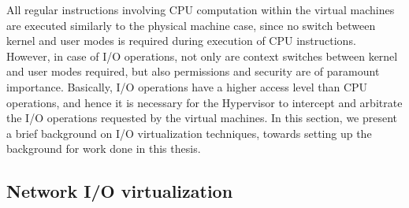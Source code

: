 All regular instructions involving CPU computation within the
virtual machines are executed similarly to the physical machine
case, since no
switch between kernel and user modes is required during execution of
CPU instructions. However, in case of I/O operations, not only are
context switches between kernel and user modes required,
but also permissions and security are of paramount importance.
Basically, I/O operations have a higher access level
than CPU operations, and hence it is necessary for the Hypervisor
to intercept and arbitrate the I/O operations requested 
by the virtual machines. In this section, we present 
a brief background on I/O virtualization techniques, towards
setting up the background for work done in this thesis.

\subsection{Network I/O virtualization}


